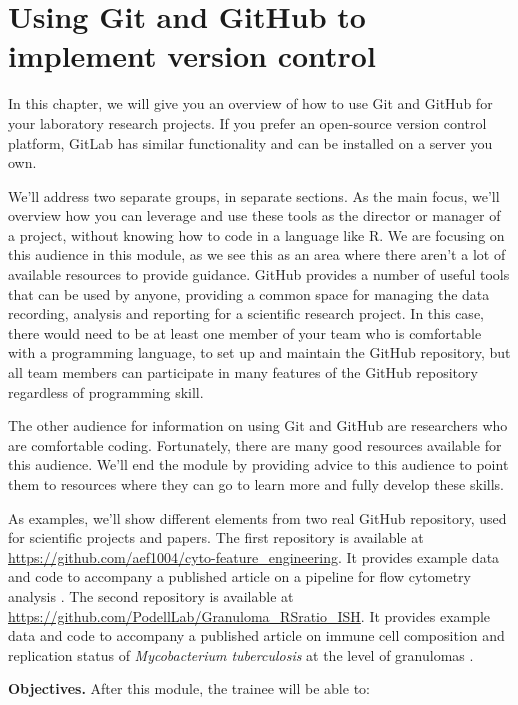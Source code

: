 \documentclass[]{tufte-book}
\begin{document}
\section{Using Git and GitHub to implement version control}\label{module11}

In this chapter, we will give you an overview of how to use Git and GitHub
for your laboratory research projects. If you prefer an open-source version
control platform, GitLab has similar functionality and can be installed on
a server you own.

We'll address two separate groups, in separate sections. As the main focus,
we'll overview how you can leverage and use these tools as the director or
manager of a project, without knowing how to code in a language like R. We are
focusing on this audience in this module, as we see this as an area where there
aren't a lot of available resources to provide guidance. GitHub provides a
number of useful tools that can be used by anyone, providing a common space for
managing the data recording, analysis and reporting for a scientific research
project. In this case, there would need to be at least one member of your team
who is comfortable with a programming language, to set up and maintain the
GitHub repository, but all team members can participate in many features of the
GitHub repository regardless of programming skill.

The other audience for information on using Git and GitHub are researchers who
are comfortable coding. Fortunately, there are many good resources available for
this audience. We'll end the module by providing advice to this audience to
point them to resources where they can go to learn more and fully develop these
skills.

As examples, we'll show different elements from two real GitHub repository, used
for scientific projects and papers. The first repository is available at
\url{https://github.com/aef1004/cyto-feature_engineering}. It provides example data
and code to accompany a published article on a pipeline for flow cytometry
analysis \citep{fox2020cyto}. The second repository is available at \url{https://github.com/PodellLab/Granuloma_RSratio_ISH}.
It provides example data and code to accompany a published article on immune
cell composition and replication status of \emph{Mycobacterium tuberculosis} at
the level of granulomas \citep{cooper15heterogeneity}.

\textbf{Objectives.} After this module, the trainee will be able to:
\end{document}
